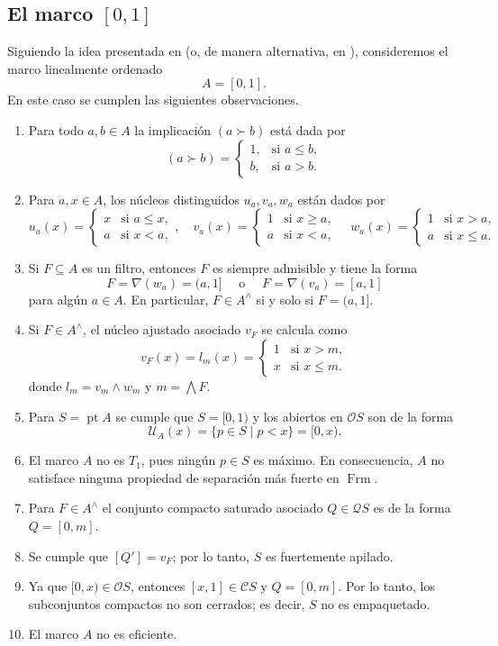 \documentclass[11pt]{amsart}
\DeclareMathOperator{\pt}{pt}
\DeclareMathOperator{\Frm}{Frm}
\theoremstyle{plain}
\theoremstyle{definition}
\begin{document}
\subsection{El marco $[0,1]$}
Siguiendo la idea presentada en \cite{simmons2006regularity} (o, de manera alternativa, en \cite{simmons2004vietoris}), consideremos el marco linealmente ordenado 
\[
A=[0,1].
\] 
En este caso se cumplen las siguientes observaciones.
\begin{enumerate}
\item Para todo $a,b\in A$ la implicación $(a\succ b)$ está dada por
\[
(a\succ b)=\begin{cases}
1, & \text{si } a\leq b,\\
b, & \text{si } a>b.
\end{cases}
\]
\item Para $a, x\in A$, los núcleos distinguidos $u_a, v_a, w_a$ están dados por
\[
u_a(x)=\begin{cases}
  x & \text{si }a\leq x,\\
  a & \text{si }x< a,
\end{cases}, \quad v_a(x)=\begin{cases}
1 & \text{si } x\geq a,\\
a & \text{si } x<a,
\end{cases} \quad w_a(x)=\begin{cases}
1 & \text{si } x>a,\\
a & \text{si } x\leq a.
\end{cases}
\]

\item Si $F\subseteq A$ es un filtro, entonces $F$ es siempre admisible y tiene la forma
\[
F=\nabla(w_a)=(a, 1]\quad \mbox{ o }\quad F=\nabla(v_a)=[a, 1]
\]
para algún $a\in A$. En particular, $F\in A^\wedge$ si y solo si $F=(a, 1]$.

\item Si $F\in A^\wedge$, el núcleo ajustado asociado $v_F$ se calcula como
\begin{equation}\label{eq:lm}
v_F(x)=l_m(x)=\begin{cases}
1 & \text{si } x> m,\\
x & \text{si } x\leq m.
\end{cases}
\end{equation}
donde $l_m=v_m\wedge w_m$ y $m=\bigwedge F$.
\item Para $S=\pt A$ se cumple que $S=[0,1)$ y los abiertos en $\mathcal{O}S$ son de la forma
\[
\mathcal{U}_A(x)=\{p\in S\mid p<x\}=[0,x).
\]
\item El marco $A$ no es $T_1$, pues ningún $p\in S$ es máximo. En consecuencia, $A$ no satisface ninguna propiedad de separación más fuerte en $\Frm$.
\item Para $F\in A^\wedge$ el conjunto compacto saturado asociado $Q\in \mathcal{Q}S$ es de la forma $Q=[0,m]$.
\item Se cumple que $[Q']=v_F$; por lo tanto, $S$ es fuertemente apilado.
\item Ya que $[0, x)\in \mathcal{O}S$, entonces $[x, 1]\in \mathcal{C}S$ y $Q=[0, m]$. Por lo tanto, los subconjuntos compactos no son cerrados; es decir, $S$ no es empaquetado.
\item El marco $A$ no es eficiente.


\end{enumerate}
\end{document}
